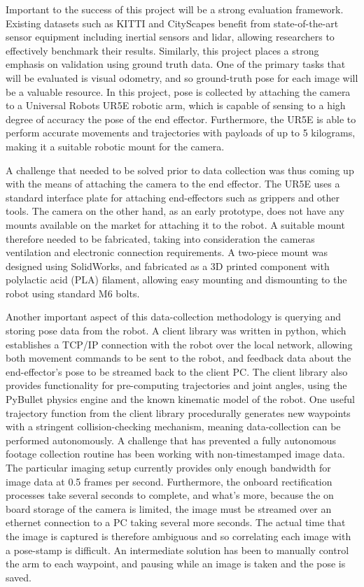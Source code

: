 \documentclass[openany]{book}
\begin{document}
Important to the success of this project will be a strong evaluation framework. Existing datasets such as KITTI and CityScapes benefit from state-of-the-art sensor equipment including inertial sensors and lidar, allowing researchers to effectively benchmark their results. Similarly, this project places a strong emphasis on validation using ground truth data. One of the primary tasks that will be evaluated is visual odometry, and so ground-truth pose for each image will be a valuable resource. In this project, pose is collected by attaching the camera to a Universal Robots UR5E robotic arm, which is capable of sensing to a high degree of accuracy the pose of the end effector. Furthermore, the UR5E is able to perform accurate movements and trajectories with payloads of up to 5 kilograms, making it a suitable robotic mount for the camera. 

A challenge that needed to be solved prior to data collection was thus coming up with the means of attaching the camera to the end effector. The UR5E uses a standard interface plate for attaching end-effectors such as grippers and other tools. The camera on the other hand, as an early prototype, does not have any mounts available on the market for attaching it to the robot. A suitable mount therefore needed to be fabricated, taking into consideration the cameras ventilation and electronic connection requirements. A two-piece mount was designed using SolidWorks, and fabricated as a 3D printed component with polylactic acid (PLA) filament, allowing easy mounting and dismounting to the robot using standard M6 bolts. 

Another important aspect of this data-collection methodology is querying and storing pose data from the robot. A client library was written in python, which establishes a TCP/IP connection with the robot over the local network, allowing both movement commands to be sent to the robot, and feedback data about the end-effector's pose to be streamed back to the client PC. The client library also provides functionality for pre-computing trajectories and joint angles, using the PyBullet physics engine and the known kinematic model of the robot. One useful trajectory function from the client library procedurally generates new waypoints with a stringent collision-checking mechanism, meaning data-collection can be performed autonomously. A challenge that has prevented a fully autonomous footage collection routine has been working with non-timestamped image data. The particular imaging setup currently provides only enough bandwidth for image data at 0.5 frames per second. Furthermore, the onboard rectification processes take several seconds to complete, and what's more, because the on board storage of the camera is limited, the image must be streamed over an ethernet connection to a PC taking several more seconds. The actual time that the image is captured is therefore ambiguous and so correlating each image with a pose-stamp is difficult. An intermediate solution has been to manually control the arm to each waypoint, and pausing while an image is taken and the pose is saved. 
\end{document}
